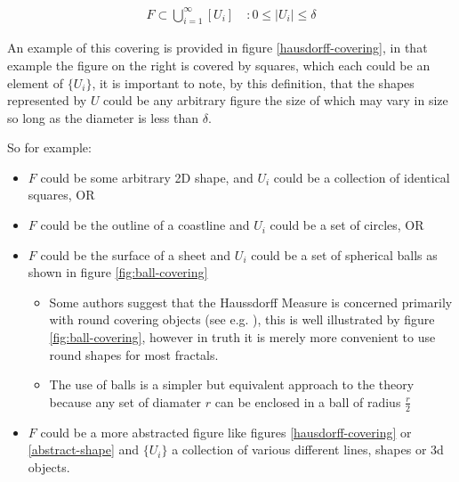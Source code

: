 \documentclass[11pt]{article}
\begin{document}
\begin{align}
    F \subset \bigcup^\infty_{i=1} \left[ U_i \right] \quad : 0 \leq \left\lvert U_i \right\rvert \leq \delta \label{eq:hausdorff-covering}
\end{align}

An example of this covering is provided in figure \ref{hausdorff-covering}, in that example the figure on the right is covered by squares, which each could be an element of \(\{U_{i}\}\), it is important to note, by this definition, that the shapes represented by \(U\) could be any arbitrary figure \cite[\S 2.1]{falconerFractalGeometryMathematical2003b} the size of which may vary in size so long as the diameter is less than \(\delta\).


So for example:

\begin{itemize}
\item \(F\) could be some arbitrary 2D shape, and \(U_{i}\) could be
a collection of identical squares, OR

\item \(F\) could be the outline of a coastline and \(U_{i}\) could be a set of circles, OR

\item \(F\) could be the surface of a sheet and \(U_{i}\) could be a set of spherical balls as shown in figure \ref{fig:ball-covering}

\begin{itemize}
\item Some authors suggest that the Haussdorff Measure is concerned primarily with round covering objects (see e.g. \cite{sandersonFractalsAreTypically2017}), this is well illustrated by figure \ref{fig:ball-covering}, however in truth it is merely more convenient to use round shapes for most fractals.

\item The use of balls is a simpler but equivalent approach to the theory \cite[ ]{falconerFractalGeometryMathematical2003b} because any set of diamater \(r\) can be enclosed in a ball of radius \(\frac{r}{2}\) \cite[p. 166]{edgarMeasureTopologyFractal2008}
\end{itemize}

\item \(F\) could be a more abstracted figure like figures \ref{hausdorff-covering} or \ref{abstract-shape}  and \(\{U_{i}\}\) a collection of various different lines, shapes or 3d objects.
\end{itemize}
\end{document}
